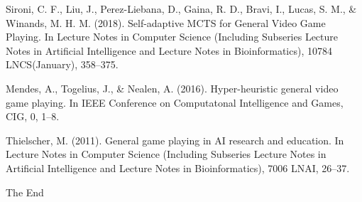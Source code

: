 \documentclass{beamer}
\begin{document}
\begin{frame}[allowframebreaks]
{\begin{thebibliography}{99}
    Sironi, C. F., Liu, J., Perez-Liebana, D., Gaina, R. D., Bravi, I., Lucas, S. M., \& Winands, M. H. M. (2018). 
    \newblock Self-adaptive MCTS for General Video Game Playing. 
    \newblock In Lecture Notes in Computer Science (Including Subseries Lecture Notes in Artificial Intelligence and Lecture Notes in Bioinformatics), 10784 LNCS(January), 358–375.

    Mendes, A., Togelius, J., \& Nealen, A. (2016). 
    \newblock Hyper-heuristic general video game playing. 
    \newblock In IEEE Conference on Computatonal Intelligence and Games, CIG, 0, 1–8.

    Thielscher, M. (2011). 
    \newblock General game playing in AI research and education. 
    \newblock In Lecture Notes in Computer Science (Including Subseries Lecture Notes in Artificial Intelligence and Lecture Notes in Bioinformatics), 7006 LNAI, 26–37.

    \end{thebibliography}
}
\end{frame}


\begin{frame}
\Huge{\centerline{The End}}
\end{frame}

\end{document}
